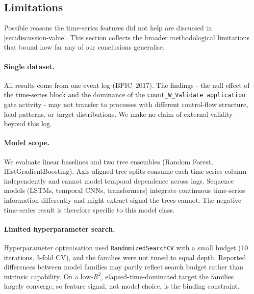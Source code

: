 \documentclass[runningheads]{llncs}
\begin{document}

\subsection{Limitations}
\label{sec:discussion-limits}

Possible reasons the time-series features did not help are discussed in
\autoref{sec:discussion-value}. This section collects the broader methodological
limitations that bound how far any of our conclusions generalise.

\paragraph{Single dataset.}
All results come from one event log (BPIC~2017). The findings - the null
effect of the time-series block and the dominance of the
\texttt{count\_W\_Validate application} gate activity - may not transfer to
processes with different control-flow structure, load patterns, or target
distributions. We make no claim of external validity beyond this log.

\paragraph{Model scope.}
We evaluate linear baselines and two tree ensembles (Random Forest,
HistGradientBoosting). Axis-aligned tree splits consume each time-series column
independently and cannot model temporal dependence across lags. Sequence models
(LSTMs, temporal CNNs, transformers) integrate continuous time-series
information differently and might extract signal the trees cannot. The negative
time-series result is therefore specific to this model class.

\paragraph{Limited hyperparameter search.}
Hyperparameter optimisation used \texttt{RandomizedSearchCV} with a small budget
(10 iterations, 3-fold CV), and the families were not tuned to equal depth.
Reported differences between model families may partly reflect search budget
rather than intrinsic capability. On a low-$R^2$, elapsed-time-dominated target
the families largely converge, so feature signal, not model choice, is the
binding constraint.
\end{document}
